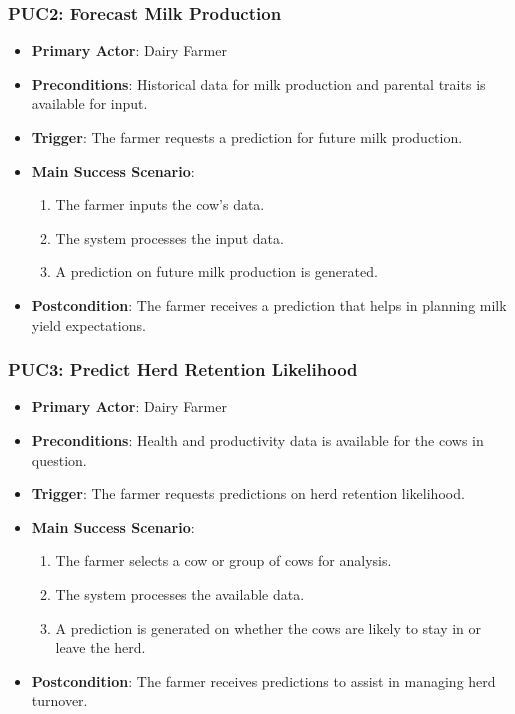 \documentclass[12pt]{article}
\begin{document}
\subsubsection{PUC2: Forecast Milk Production}
\begin{itemize}
    \item \textbf{Primary Actor}: Dairy Farmer
    \item \textbf{Preconditions}: Historical data for milk production and 
    parental traits is available for input.
    \item \textbf{Trigger}: The farmer requests a prediction for future milk 
    production.
    \item \textbf{Main Success Scenario}:
    \begin{enumerate}
        \item The farmer inputs the cow's data.
        \item The system processes the input data.
        \item A prediction on future milk production is generated.
    \end{enumerate}
    \item \textbf{Postcondition}: The farmer receives a prediction that helps 
    in planning milk yield expectations.
\end{itemize}

\subsubsection{PUC3: Predict Herd Retention Likelihood}
\begin{itemize}
    \item \textbf{Primary Actor}: Dairy Farmer
    \item \textbf{Preconditions}: Health and productivity data is available 
    for the cows in question.
    \item \textbf{Trigger}: The farmer requests predictions on herd retention 
    likelihood.
    \item \textbf{Main Success Scenario}:
    \begin{enumerate}
        \item The farmer selects a cow or group of cows for analysis.
        \item The system processes the available data.
        \item A prediction is generated on whether the cows are likely to stay 
        in or leave the herd.
    \end{enumerate}
    \item \textbf{Postcondition}: The farmer receives predictions to assist in 
    managing herd turnover.
\end{itemize}
\end{document}
